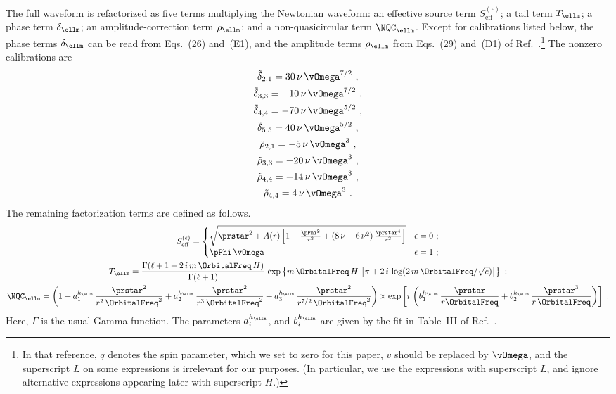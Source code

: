 \documentclass[twoside, aps, prd, letterpaper, noshowpacs, %
amsmath, amssymb, amsfonts, nofootinbib, floatfix, notitlepage]%
{revtex4-1}
\begin{document}
The full waveform is refactorized as five terms multiplying the
Newtonian waveform: an effective source term
$S_{\text{eff}}^{(\epsilon)}$; a tail term $T_{\ellm}$; a phase term
$\delta_{\ellm}$; an amplitude-correction term $\rho_{\ellm}$; and a
non-quasicircular term $\NQC_{\ellm}$.  Except for calibrations listed
below, the phase terms $\delta_{\ellm}$ can be read from Eqs.~(26)
and~(E1), and the amplitude terms $\rho_{\ellm}$ from Eqs.~(29)
and~(D1) of Ref.~\cite{PanEtAl:2010b}.\footnote{In that reference, $q$
  denotes the spin parameter, which we set to zero for this paper, $v$
  should be replaced by $\vOmega$, and the superscript $L$ on some
  expressions is irrelevant for our purposes.  (In particular, we use
  the expressions with superscript $L$, and ignore alternative
  expressions appearing later with superscript $H$.)}  The nonzero
calibrations are
\begin{gather}
  \label{eq:CalibratedDeltaAndRhoTerms}
  \tilde{\delta}_{2,1} = 30\, \nu\, \vOmega^{7/2}~, \\
  \tilde{\delta}_{3,3} = -10\, \nu\, \vOmega^{7/2}~, \\
  \tilde{\delta}_{4,4} = -70\, \nu\, \vOmega^{5/2}~, \\
  \tilde{\delta}_{5,5} = 40\, \nu\, \vOmega^{5/2}~, \\
  \tilde{\rho}_{2,1} = -5\, \nu\, \vOmega^{3}~, \\
  \tilde{\rho}_{3,3} = -20\, \nu\, \vOmega^{3}~, \\
  \tilde{\rho}_{4,4} = -14\, \nu\, \vOmega^{3}~, \\ %
  \tilde{\rho}_{4,4} = 4\, \nu\, \vOmega^{3}~.
\end{gather}
The remaining factorization terms are defined as follows.
\begin{gather}
  \label{eq:DefineSourceTerm}
  S_{\text{eff}}^{(\epsilon)} =
  \begin{cases}
    \sqrt{\prstar^{2} + A(r) \left[ 1 + \frac{\pPhi^{2}}{r^{2}} + (8\,
        \nu - 6\, \nu^{2})\, \frac{\prstar^{4}} {r^{2}} \right]} &
    \epsilon=0~;
    \\
    \pPhi\, \vOmega & \epsilon=1~;
  \end{cases}
  \\
  \label{eq:DefineTailTerm}
  T_{\ellm} = \frac{\Gamma(\ell + 1 - 2\, i\, m\, \OrbitalFreq\, H)}
  {\Gamma(\ell + 1)}\, \exp \left\{ m\, \OrbitalFreq\, H\, \left[\pi +
      2\, i\, \log(2\, m\, \OrbitalFreq / \sqrt{e}) \right] \right\}~;
  \\
  \label{eq:DefineNQCTerm}
  \NQC_{\ellm} = \left( 1 + a_{1}^{h_{\ellm}}\, \frac{\prstar^{2}}
    {r^{2}\, \OrbitalFreq^{2}} + a_{2}^{h_{\ellm}}\,
    \frac{\prstar^{2}} {r^{3}\, \OrbitalFreq^{2}} +
    a_{3}^{h_{\ellm}}\, \frac{\prstar^{2}} {r^{7/2}\,
      \OrbitalFreq^{2}} \right) \times \exp \left[ i\, \left(
      b_{1}^{h_{\ellm}}\, \frac{\prstar} {r \OrbitalFreq} +
      b_{2}^{h_{\ellm}}\, \frac{\prstar^{3}} {r\, \OrbitalFreq}
    \right) \right]~.
\end{gather}
Here, $\Gamma$ is the usual Gamma function.  The parameters
$a_{i}^{h_{\ellm}}$, and $b_{i}^{h_{\ellm}}$ are given by the fit in
Table~III of Ref.~\cite{PanEtAl:2011}.
\end{document}

